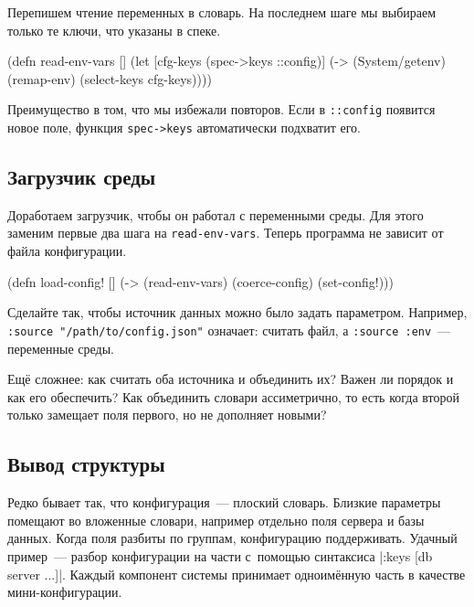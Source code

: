 \noindent
Перепишем чтение переменных в словарь. На последнем шаге мы выбираем только те
ключи, что указаны в спеке.

\begin{english}
  \begin{clojure}
(defn read-env-vars []
  (let [cfg-keys (spec->keys ::config)]
    (-> (System/getenv)
        (remap-env)
        (select-keys cfg-keys))))
  \end{clojure}
\end{english}

Преимущество в том, что мы избежали повторов. Если в \verb|::config| появится
новое поле, функция \verb|spec->keys| автоматически подхватит его.

\subsection{Загрузчик среды}

Доработаем загрузчик, чтобы он работал с переменными среды. Для этого заменим
первые два шага на \verb|read-env-vars|. Теперь программа не зависит от файла
конфигурации.

\begin{english}
  \begin{clojure}
(defn load-config! []
  (-> (read-env-vars)
      (coerce-config)
      (set-config!)))
  \end{clojure}
\end{english}

Сделайте так, чтобы источник данных можно было задать параметром. Например,
\verb|:source "/path/to/config.json"| означает: считать файл, а
\verb|:source :env|~--- переменные среды.


Ещё сложнее: как считать оба источника и объединить их? Важен ли порядок и как
его обеспечить? Как объединить словари ассиметрично, то есть когда второй только
замещает поля первого, но не дополняет новыми?

\subsection{Вывод структуры}


Редко бывает так, что конфигурация~--- плоский словарь. Близкие параметры
помещают во вложенные словари, например отдельно поля сервера и базы
данных. Когда поля разбиты по группам, конфигурацию поддерживать. Удачный
пример~--- разбор конфигурации на части с~помощью синтаксиса
\spverb|{:keys [db server ...]}|. Каждый компонент системы принимает одноимённую
часть в качестве мини-конфигурации.

